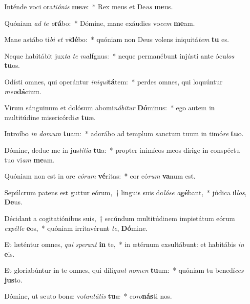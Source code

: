 \item Inténde voci ora\textit{ti}\textit{ó}\textit{nis} \textbf{me}æ:~* Rex meus et De\textit{us} \textbf{me}us.
\item Quóniam \textit{ad} \textit{te} \textit{o}\textbf{rá}bo:~* Dómine, mane exáudies vo\textit{cem} \textbf{me}am.
\item Mane astábo ti\textit{bi} \textit{et} \textit{vi}\textbf{dé}bo:~* quóniam non Deus volens iniquitá\textit{tem} \textbf{tu} es.
\item Neque habitábit jux\textit{ta} \textit{te} \textit{ma}\textbf{lí}gnus:~* neque permanébunt injústi ante ócu\textit{los} \textbf{tu}os.
\item Odísti omnes, qui operántur \textit{in}\textit{i}\textit{qui}\textbf{tá}tem:~* perdes omnes, qui loquúntur \textit{men}\textbf{dá}cium.
\item Virum sánguinum et dolósum abomi\textit{ná}\textit{bi}\textit{tur} \textbf{Dó}minus:~* ego autem in multitúdine misericórdi\textit{æ} \textbf{tu}æ.
\item Introíbo \textit{in} \textit{do}\textit{mum} \textbf{tu}am:~* adorábo ad templum sanctum tuum in timó\textit{re} \textbf{tu}o.
\item Dómine, deduc me in jus\textit{tí}\textit{ti}\textit{a} \textbf{tu}a:~* propter inimícos meos dírige in conspéctu tuo vi\textit{am} \textbf{me}am.
\item Quóniam non est in ore \textit{e}\textit{ó}\textit{rum} \textbf{vé}ritas:~* cor eó\textit{rum} \textbf{va}num est.
\item Sepúlcrum patens est guttur eórum,~† linguis suis do\textit{ló}\textit{se} \textit{a}\textbf{gé}bant,~* júdica il\textit{los}, \textbf{De}us.
\item Décidant a cogitatiónibus suis,~† secúndum multitúdinem impietátum eórum \textit{ex}\textit{pél}\textit{le} \textbf{e}os,~* quóniam irritavérunt \textit{te}, \textbf{Dó}mine.
\item Et læténtur omnes, \textit{qui} \textit{spe}\textit{rant} \textbf{in} te,~* in ætérnum exsultábunt: et habitábis \textit{in} \textbf{e}is.
\item Et gloriabúntur in te omnes, qui díli\textit{gunt} \textit{no}\textit{men} \textbf{tu}um:~* quóniam tu benedí\textit{ces} \textbf{jus}to.
\item Dómine, ut scuto bonæ vo\textit{lun}\textit{tá}\textit{tis} \textbf{tu}æ~* co\textit{ro}\textbf{nás}ti nos.
